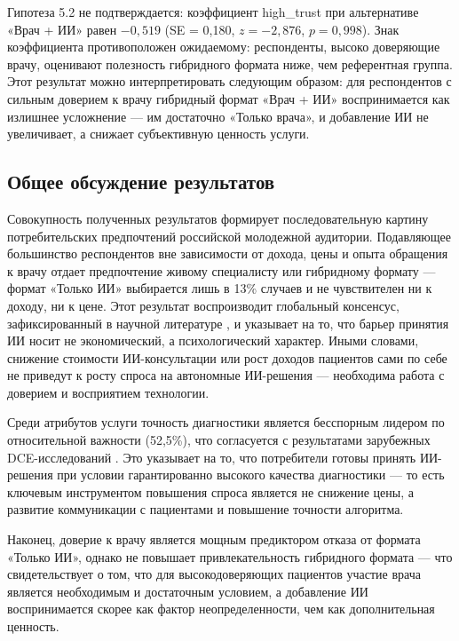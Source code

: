 \documentclass[12pt, a4paper]{article}
\begin{document}
Гипотеза 5.2 не подтверждается: коэффициент high\_trust при альтернативе «Врач + ИИ» равен $-0,519$ (SE = 0,180, $z = -2,876$, $p = 0,998$). Знак коэффициента противоположен ожидаемому: респонденты, высоко доверяющие врачу, оценивают полезность гибридного формата ниже, чем референтная группа. Этот результат можно интерпретировать следующим образом: для респондентов с сильным доверием к врачу гибридный формат «Врач + ИИ» воспринимается как излишнее усложнение --- им достаточно «Только врача», и добавление ИИ не увеличивает, а снижает субъективную ценность услуги.

\subsection{Общее обсуждение результатов}
Совокупность полученных результатов формирует последовательную картину потребительских предпочтений российской молодежной аудитории. Подавляющее большинство респондентов вне зависимости от дохода, цены и опыта обращения к врачу отдает предпочтение живому специалисту или гибридному формату --- формат «Только ИИ» выбирается лишь в 13\% случаев и не чувствителен ни к доходу, ни к цене. Этот результат воспроизводит глобальный консенсус, зафиксированный в научной литературе \cite{Jutzi2020, McRae2025}, и указывает на то, что барьер принятия ИИ носит не экономический, а психологический характер. Иными словами, снижение стоимости ИИ-консультации или рост доходов пациентов сами по себе не приведут к росту спроса на автономные ИИ-решения --- необходима работа с доверием и восприятием технологии.

Среди атрибутов услуги точность диагностики является бесспорным лидером по относительной важности (52,5\%), что согласуется с результатами зарубежных DCE-исследований \cite{Liu2021, Jagemann2024}. Это указывает на то, что потребители готовы принять ИИ-решения при условии гарантированно высокого качества диагностики --- то есть ключевым инструментом повышения спроса является не снижение цены, а развитие коммуникации с пациентами и повышение точности алгоритма.

Наконец, доверие к врачу является мощным предиктором отказа от формата «Только ИИ», однако не повышает привлекательность гибридного формата --- что свидетельствует о том, что для высокодоверяющих пациентов участие врача является необходимым и достаточным условием, а добавление ИИ воспринимается скорее как фактор неопределенности, чем как дополнительная ценность.

\newpage
\end{document}
